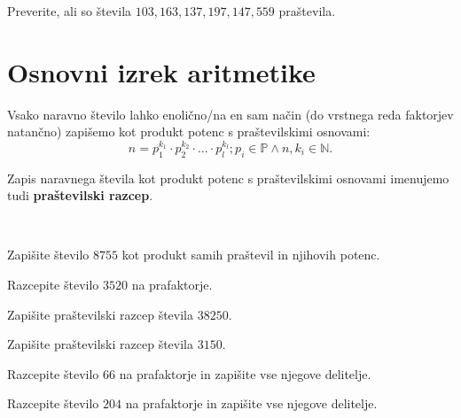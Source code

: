     
            

        \begin{naloga}
            Preverite, ali so števila $103, 163, 137, 197, 147, 559$ praštevila.
        \end{naloga}
            
    
    
    
\section{Osnovni izrek aritmetike}
    
    
        Vsako naravno število lahko enolično/na en sam način (do vrstnega reda faktorjev natančno) zapišemo kot produkt potenc s praštevilskimi osnovami:
        $$ n=p_1^{k_1}\cdot p_2^{k_2}\cdot\ldots\cdot p_l^{k_l};  p_i\in\mathbb{P}\land n, k_i\in\mathbb{N}.$$

    

        Zapis naravnega števila kot produkt potenc s praštevilskimi osnovami imenujemo tudi \textbf{praštevilski razcep}.
                

        ~\\
        \begin{naloga}
            Zapišite število $8755$ kot produkt samih praštevil in njihovih potenc. 
        \end{naloga}

        \begin{naloga}
            Razcepite število $3520$ na prafaktorje. 
        \end{naloga}

        \begin{naloga}
            Zapišite praštevilski razcep števila $38250$. 
        \end{naloga}

        \begin{naloga}
            Zapišite praštevilski razcep števila $3150$. 
        \end{naloga}
    
        \begin{naloga}
            Razcepite število $66$ na prafaktorje in zapišite vse njegove delitelje. 
        \end{naloga}

        \begin{naloga}
            Razcepite število $204$ na prafaktorje in zapišite vse njegove delitelje. 
        \end{naloga}
    
